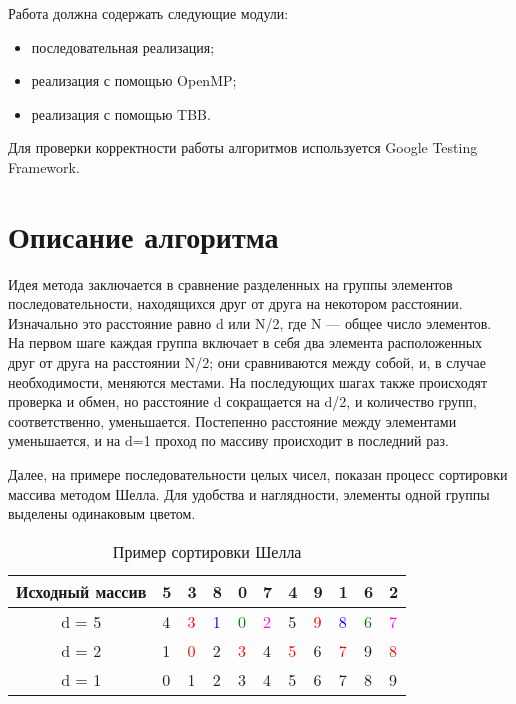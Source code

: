 \documentclass{report}
\begin{document}
Работа должна содержать следующие модули:
\begin{itemize}
  \item последовательная реализация;
  \item реализация с помощью OpenMP;
  \item реализация с помощью TBB.
\end{itemize}

Для проверки корректности работы алгоритмов используется Google Testing Framework.
\newpage

\section*{Описание алгоритма}
Идея метода заключается в сравнение разделенных на группы элементов последовательности, находящихся друг от друга на некотором расстоянии. Изначально это расстояние равно d или N/2, где N — общее число элементов. На первом шаге каждая группа включает в себя два элемента расположенных друг от друга на расстоянии N/2; они сравниваются между собой, и, в случае необходимости, меняются местами. На последующих шагах также происходят проверка и обмен, но расстояние d сокращается на d/2, и количество групп, соответственно, уменьшается. Постепенно расстояние между элементами уменьшается, и на d=1 проход по массиву происходит в последний раз.

Далее, на примере последовательности целых чисел, показан процесс сортировки массива методом Шелла. Для удобства и наглядности, элементы одной группы выделены одинаковым цветом.
\begin{table}[!h]
\centering
\begin{tabular}{ | c | l | l | l  | l | l | l | l | l | l | l |}
\hline
Исходный массив & 5 & 3 & 8 & 0 & 7 & 4 & 9 & 1 & 6 & 2\\ \hline
d = 5 &4&\textcolor{red}{3}&\textcolor{blue}{1}&\textcolor{green}{0}&\textcolor{magenta}{2}&5&\textcolor{red}{9}&\textcolor{blue}{8}&\textcolor{green}{6}&\textcolor{magenta}{7}\\ \hline
d = 2 &1&\textcolor{red}{0}&2&\textcolor{red}{3}&4&\textcolor{red}{5}&6&\textcolor{red}{7}&9&\textcolor{red}{8}\\ \hline
d = 1 & 0 & 1 & 2 & 3 & 4 & 5 & 6 & 7 & 8 & 9\\ \hline
\end{tabular}
\caption{Пример сортировки Шелла}
\end{table}
\end{document}
